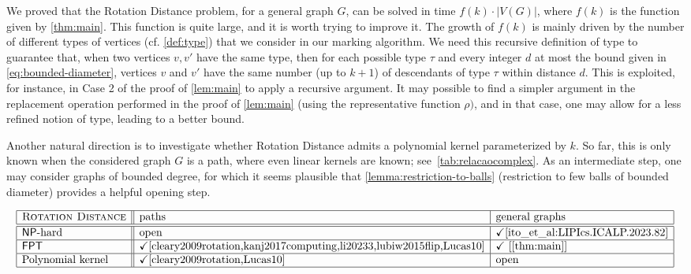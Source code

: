 \documentclass[a4paper,UKenglish,cleveref, autoref, thm-restate]{lipics-v2021}
\newcommand{\NP}{\mathcal{NP}}
\renewcommand{\NP}{{\sf NP}\xspace}
\newcommand{\FPT}{{\sf FPT}\xspace}
\newcommand{\kelimination}{{\sc Rotation Distance}\xspace}
\begin{document}
We proved that the  \kelimination problem, for a general graph $G$, can be solved in time $f(k) \cdot |V(G)|$, where $f(k)$ is the function given by \autoref{thm:main}. This function is quite large, and it is worth trying to improve it. The growth of $f(k)$ is mainly driven by the number of different types of vertices (cf. \autoref{def:type}) that we consider in our marking algorithm. We need this recursive definition of type to guarantee that, when two vertices $v,v'$ have the same type, then for each possible type $\tau$ and every integer $d$ at most the bound given in \autoref{eq:bounded-diameter}, vertices $v$ and $v'$ have the same number (up to $k+1$) of descendants of  type $\tau$ within distance $d$. This is exploited, for instance, in Case 2 of the proof of \autoref{lem:main} to apply a recursive argument. It may possible to find a simpler argument in the replacement operation performed in the proof of \autoref{lem:main} (using the representative function $\rho)$, and in that case, one may allow for a less refined notion of type, leading to a better bound.

Another natural direction is to investigate whether \kelimination admits a polynomial kernel parameterized by $k$. So far, this is only known when the considered graph $G$ is a path, where even linear kernels are known\cite{cleary2009rotation,Lucas10}; see~\autoref{tab:relacaocomplex}. As an intermediate step, one may consider graphs of bounded degree, for which it seems plausible that \autoref{lemma:restriction-to-balls} (restriction to few balls of bounded diameter) provides a helpful opening step.




\begin{table}[h!tb]
    \centering
    \vspace{-.35cm}
$$
    \begin{array}{|l||l|l|}
    \hline
        \text{\kelimination}      & \text{paths}  &   \text{general graphs} \\ \hline \hline
        \NP\text{-hard}      &   \text{open}  & \checkmark
\text{\cite{ito_et_al:LIPIcs.ICALP.2023.82}} \\ \hline
        \FPT       & \checkmark \text{\cite{cleary2009rotation,kanj2017computing,li20233,lubiw2015flip,Lucas10}}   &  \checkmark \text{ [\autoref{thm:main}]}  \\ \hline
               \text{Polynomial kernel} & \checkmark \text{\cite{cleary2009rotation,Lucas10}}   & \text{open}        \\ \hline
    \end{array}
    $$
\caption{Known results and open problems about the (parameterized) complexity of the \kelimination problem, both on paths and general graphs.\label{tab:relacaocomplex}}
\end{table}
\end{document}

